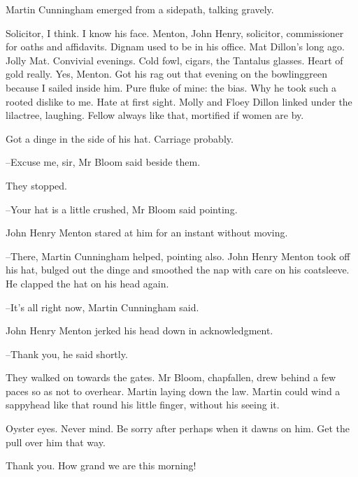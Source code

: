 Martin Cunningham emerged from a sidepath, talking gravely.

Solicitor, I think.
I know his face.
Menton, John Henry, solicitor,
commissioner for oaths and affidavits.
Dignam used to be in his office.
Mat Dillon's long ago.
Jolly Mat.
Convivial evenings.
Cold fowl, cigars, the Tantalus glasses.
Heart of gold really.
Yes, Menton.
Got his rag out that evening on the bowlinggreen because I sailed inside him.
Pure fluke of mine:
the bias.
Why he took such a rooted dislike to me.
Hate at first sight.
Molly and Floey Dillon linked under the lilactree, laughing.
Fellow always like that, mortified if women are by.

Got a dinge in the side of his hat.
Carriage probably.

--Excuse me, sir,
Mr Bloom said beside them.

They stopped.

--Your hat is a little crushed,
Mr Bloom said pointing.

John Henry Menton stared at him for an instant without moving.

--There, Martin Cunningham helped, pointing also.
John Henry Menton took off his hat,
bulged out the dinge
and smoothed the nap with care on his coatsleeve.
He clapped the hat on his head again.

--It's all right now,
Martin Cunningham said.

John Henry Menton jerked his head down in acknowledgment.

--Thank you,
he said shortly.

They walked on towards the gates.
Mr Bloom, chapfallen, drew behind a few paces so as not to overhear.
Martin laying down the law.
Martin could wind a sappyhead like that round his little finger,
without his seeing it.

Oyster eyes.
Never mind.
Be sorry after perhaps when it dawns on him.
Get the pull over him that way.

Thank you.
How grand we are this morning!



